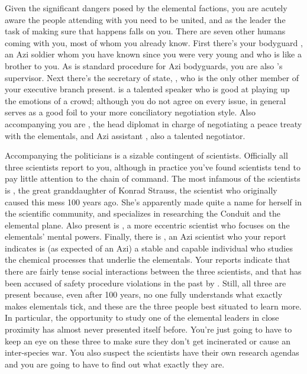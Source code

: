 \documentclass[char]{elementals}
\begin{document}
Given the significant dangers posed by the elemental factions, you are acutely aware the people attending with you need to be united, and as the leader the task of making sure that happens falls on you. There are seven other humans coming with you, most of whom you already know. First there's your bodyguard \cRomeo{\intro}, an Azi soldier whom you have known since you were very young and who is like a brother to you. As is standard procedure for Azi bodyguards, you are also \cRomeo{}'s supervisor. Next there's the secretary of state, \cDema{\intro}, who is the only other member of your executive branch present. \cDema{\They} is a talented speaker who is good at playing up the emotions of a crowd; although you do not agree on every issue, in general \cDema{\they} serves as a good foil to your more conciliatory negotiation style. Also accompanying you are \cAvatar{\intro}, the head diplomat in charge of negotiating a peace treaty with the elementals, and \cAvatar{\their} Azi assistant \cDiplomat{\intro}, also a talented negotiator.

Accompanying the politicians is a sizable contingent of scientists. Officially all three scientists report to you, although in practice you've found scientists tend to pay little attention to the chain of command. The most infamous of the scientists is \cGD{\intro}, the great granddaughter of Konrad Strauss, the scientist who originally caused this mess 100 years ago. She's apparently made quite a name for herself in the scientific community, and specializes in researching the Conduit and the elemental plane. Also present is \cMS{\intro}, a more eccentric scientist who focuses on the elementals' mental powers. Finally, there is \cScientist{\intro}, an Azi scientist who your report indicates is (as expected of an Azi) a stable and capable individual who studies the chemical processes that underlie the elementals. Your reports indicate that there are fairly tense social interactions between the three scientists, and that \cMS{} has been accused of safety procedure violations in the past by \cScientist{}. Still, all three are present because, even after 100 years, no one fully understands what exactly makes elementals tick, and these are the three people best situated to learn more. In particular, the opportunity to study one of the elemental leaders in close proximity has almost never presented itself before. You're just going to have to keep an eye on these three to make sure they don't get incinerated or cause an inter-species war. You also suspect the scientists have their own research agendas and you are going to have to find out what exactly they are.
\end{document}
